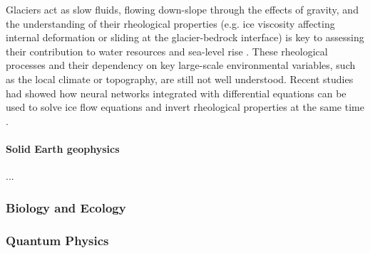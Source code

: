 Glaciers act as slow fluids, flowing down-slope through the effects of gravity, and the understanding of their rheological properties (e.g. ice viscosity affecting internal deformation or sliding at the glacier-bedrock interface) is key to assessing their contribution to water resources and sea-level rise \cite{cuffey_physics_2010}. 
These rheological processes and their dependency on key large-scale environmental variables, such as the local climate or topography, are still not well understood.
Recent studies had showed how neural networks integrated with differential equations can be used to solve ice flow equations\cite{Jouvet_Cordonnier_Kim_Lüthi_Vieli_Aschwanden_2021, Jouvet_2022} and invert rheological properties at the same time \cite{bolibar_universal_2023, wang2022discovering}.  

\paragraph{Solid Earth geophysics}
...

\subsubsection{Biology and Ecology}

\subsubsection{Quantum Physics}

